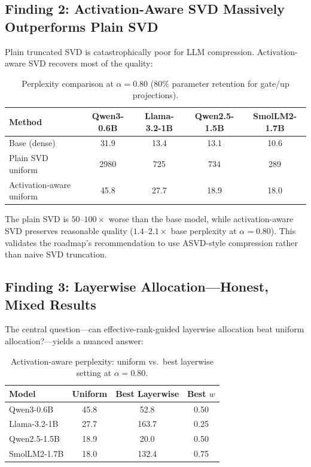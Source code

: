 \documentclass[11pt]{article}
\begin{document}
\subsection{Finding 2: Activation-Aware SVD Massively Outperforms Plain SVD}

Plain truncated SVD is catastrophically poor for LLM compression.  Activation-aware SVD recovers most of the quality:

\begin{table}[H]
\centering
\caption{Perplexity comparison at $\alpha=0.80$ (80\% parameter retention for gate/up projections).}
\begin{tabular}{lcccc}
\toprule
\textbf{Method} & \textbf{Qwen3-0.6B} & \textbf{Llama-3.2-1B} & \textbf{Qwen2.5-1.5B} & \textbf{SmolLM2-1.7B} \\
\midrule
Base (dense)                 & 31.9 & 13.4 & 13.1 & 10.6 \\
Plain SVD uniform            & 2980 & 725  & 734  & 289  \\
Activation-aware uniform     & 45.8 & 27.7 & 18.9 & 18.0 \\
\bottomrule
\end{tabular}
\end{table}

\noindent The plain SVD is $50$--$100\times$ worse than the base model, while activation-aware SVD preserves reasonable quality ($1.4$--$2.1\times$ base perplexity at $\alpha=0.80$).  This validates the roadmap's recommendation to use ASVD-style compression rather than naive SVD truncation.

\subsection{Finding 3: Layerwise Allocation---Honest, Mixed Results}

The central question---can effective-rank-guided layerwise allocation beat uniform allocation?---yields a nuanced answer:

\begin{table}[H]
\centering
\caption{Activation-aware perplexity: uniform vs.\ best layerwise setting at $\alpha=0.80$.}
\begin{tabular}{lccc}
\toprule
\textbf{Model} & \textbf{Uniform} & \textbf{Best Layerwise} & \textbf{Best $w$} \\
\midrule
Qwen3-0.6B   & 45.8  & 52.8  & 0.50 \\
Llama-3.2-1B & 27.7  & 163.7 & 0.25 \\
Qwen2.5-1.5B & 18.9  & 20.0  & 0.50 \\
SmolLM2-1.7B & 18.0  & 132.4 & 0.75 \\
\bottomrule
\end{tabular}
\end{table}
\end{document}
